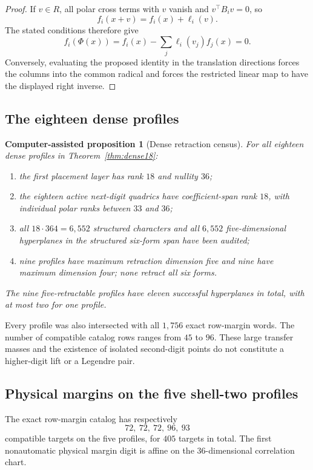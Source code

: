 \documentclass[11pt]{article}
\newtheorem{computationalproposition}[theorem]{Computer-assisted proposition}
\theoremstyle{remark}
\begin{document}
\begin{proof}
If $v\in R$, all polar cross terms with $v$ vanish and
$v^\top B_iv=0$, so
\[
 f_i(x+v)=f_i(x)+\ell_i(v).
\]
The stated conditions therefore give
\[
 f_i(\Phi(x))=f_i(x)-\sum_j\ell_i(v_j)f_j(x)=0.
\]
Conversely, evaluating the proposed identity in the translation
directions forces the columns into the common radical and forces the
restricted linear map to have the displayed right inverse.
\end{proof}

\subsection{The eighteen dense profiles}

\begin{computationalproposition}[Dense retraction census]
\label{prop:dense-retract}
For all eighteen dense profiles in Theorem~\ref{thm:dense18}:
\begin{enumerate}
\item the first placement layer has rank $18$ and nullity $36$;
\item the eighteen active next-digit quadrics have coefficient-span rank
$18$, with individual polar ranks between $33$ and $36$;
\item all $18\cdot364=6{,}552$ structured characters and all $6{,}552$
five-dimensional hyperplanes in the structured six-form span have been
audited;
\item nine profiles have maximum retraction dimension five and nine have
maximum dimension four; none retract all six forms.
\end{enumerate}
The nine five-retractable profiles have eleven successful hyperplanes in
total, with at most two for one profile.
\end{computationalproposition}

Every profile was also intersected with all $1{,}756$ exact row-margin
words.  The number of compatible catalog rows ranges from $45$ to $96$.
These large transfer masses and the existence of isolated second-digit
points do not constitute a higher-digit lift or a Legendre pair.

\subsection{Physical margins on the five shell-two profiles}

The exact row-margin catalog has respectively
\[
 72,\ 72,\ 72,\ 96,\ 93
\]
compatible targets on the five profiles, for $405$ targets in total.  The
first nonautomatic physical margin digit is affine on the
$36$-dimensional correlation chart.
\end{document}
